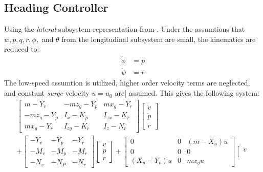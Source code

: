 	\subsection{Heading Controller}
		Using the \textit{lateral}-subsystem representation from \cite{fossen}. Under the assumtions
		that $w, p, q, r, \phi,$ and $\theta$ from the longitudinal subsystem are small, the
		kinematics are reduced to:
		\begin{align}
			\dot{\phi} &= p \\
			\dot{\psi} &= r 
		\end{align}
		The low-speed assumtion is utilized, higher order velocity terms are neglected, and
		constant \textit{surge}-velocity $u = u_0$ are| assumed. This gives the following system:
		\begin{equation}
			\begin{aligned}
				\left [ \begin{array}{ccc}
					m - Y_{\dot{v}} & - m z_g - Y_{\dot{p}} & m x_g - Y_{\dot{r}} \\
					-m z_g - Y_{\dot{p}} & I_x - K_{\dot{p}} & I_{zx} - K_{\dot{r}} \\
					m x_g - Y_{\dot{r}} & I_{zg} - K_{\dot{r}} & I_z - N_{\dot{r}} 
					\end{array} \right]
				\left [ \begin{array}{c}
					\dot{v} \\
					\dot{p} \\
					\dot{r} 
					\end{array} \right] \\
				+ \left [ \begin{array}{ccc}
					-Y_v	&	-Y_p 	&	-Y_r \\
					-M_v	&	-M_p	&	-M_r \\
					-N_v	&	-N_P	&	-N_r
					\end{array} \right]
				\left [ \begin{array}{c}
					v \\
					p \\
					r 
				\end{array} \right] + 
				\left [ \begin{array}{ccc} 
					0 & 0 & (m - X_{\dot{u}})u \\
					0 & 0 &  0 \\
					(X_{\dot{u}} - Y_{\dot{v}}) u & 0 & m x_g u 
					\end{array} \right]	
				\left [ \begin{array}{c}
					v \\

\end{array}
\end{aligned}
\end{equation}
